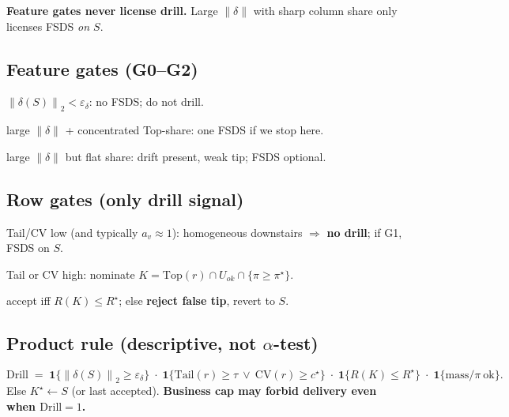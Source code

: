 \documentclass[11pt]{article}
\newcommand{\norm}[1]{\left\|#1\right\|_2}
\newcommand{\Drill}{\mathrm{Drill}}
\newcommand{\Tail}{\mathrm{Tail}}
\newcommand{\CV}{\mathrm{CV}}
\begin{document}
\textbf{Feature gates never license drill.} Large $\|\delta\|$ with sharp
column share only licenses FSDS \emph{on $S$}.

\subsection{Feature gates (G0--G2)}
\begin{description}[leftmargin=1.6em,itemsep=0.35em]
  \item[G0] $\norm{\delta(S)}<\varepsilon_\delta$: no FSDS; do not drill.
  \item[G1] large $\|\delta\|$ + concentrated Top-share: one FSDS if we stop here.
  \item[G2] large $\|\delta\|$ but flat share: drift present, weak tip; FSDS optional.
\end{description}

\subsection{Row gates (only drill signal)}
\begin{description}[leftmargin=1.6em,itemsep=0.35em]
  \item[D-stop] Tail/CV low (and typically $a_v\approx 1$):
        homogeneous downstairs $\Rightarrow$ \textbf{no drill};
        if G1, FSDS on $S$.
  \item[D-drill] Tail or CV high: nominate
        $K=\mathrm{Top}(r)\cap U_{ok}\cap\{\pi\ge\pi^\star\}$.
  \item[D-check] accept iff $R(K)\le R^\star$; else \textbf{reject false tip},
        revert to $S$.
\end{description}

\subsection{Product rule (descriptive, not $\alpha$-test)}
\begin{equation}
\label{eq:drill}
  \Drill
  \;=\;
  \mathbf{1}\{\norm{\delta(S)}\ge\varepsilon_\delta\}
  \;\cdot\;
  \mathbf{1}\{\Tail(r)\ge\tau\ \lor\ \CV(r)\ge c^\star\}
  \;\cdot\;
  \mathbf{1}\{R(K)\le R^\star\}
  \;\cdot\;
  \mathbf{1}\{\mathrm{mass}/\pi\ \mathrm{ok}\}.
\end{equation}
Else $K^\star\leftarrow S$ (or last accepted).
\textbf{Business cap may forbid delivery even when $\Drill=1$.}
\end{document}
